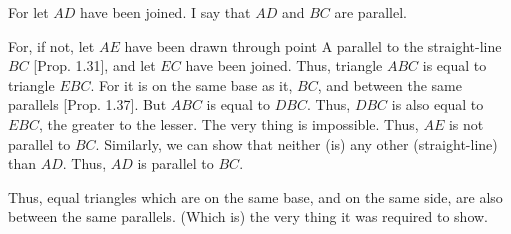 \begin{Parallel}{}{}
{For let $AD$ have been joined. I say that $AD$ and $BC$ are parallel.

For, if not, let $AE$ have been drawn through point A parallel to the straight-line $BC$ [Prop. 1.31], and let $EC$ have been joined. Thus, triangle $ABC$ is equal
to triangle $EBC$. For it is on the same base as it, $BC$, and between the
same parallels [Prop. 1.37]. But $ABC$ is equal to $DBC$. Thus, $DBC$ is
also equal to $EBC$, the greater to the lesser. The very thing is impossible.
Thus, $AE$ is not parallel to $BC$. Similarly, we can show that neither (is)
any other (straight-line) than $AD$. Thus, $AD$ is parallel to $BC$.

Thus, equal triangles which are on the same base, and on the same side, are
also between the same parallels. (Which is) the very thing it was required to show.}
\end{Parallel}

